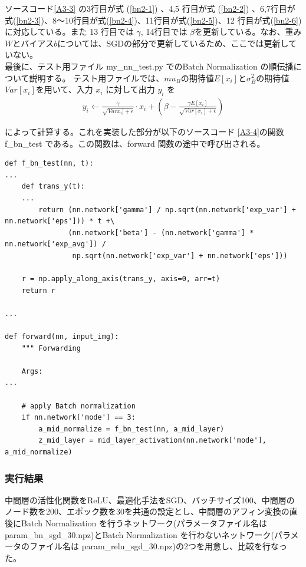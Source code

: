 \documentclass[a4paper,dvipdfmx]{jsarticle}
\begin{document}
ソースコード\ref{A3-3} の3行目が式 (\ref{bn2-1}) 、4,5 行目が式 (\ref{bn2-2}) 、6,7行目が式(\ref{bn2-3})、8〜10行目が式(\ref{bn2-4})、11行目が式(\ref{bn2-5})、12 行目が式(\ref{bn2-6}) に対応している。また 13 行目では $\gamma$, 14行目では $\beta $を更新している。なお、重み$W$とバイアス$b$については、SGDの部分で更新しているため、ここでは更新していない。\\


最後に、テスト用ファイル my\_nn\_test.py でのBatch Normalization の順伝播について説明する。
テスト用ファイルでは、$mu_B$の期待値$E[x_i]$と$\sigma_B^2$の期待値$Var[x_i]$を用いて、入力 $x_i$ に対して出力 $y_i$ を
\begin{eqnarray}
	\label{bn3-1}
	y_i \leftarrow \frac{\gamma}{\sqrt{Var{x_i] + \epsilon}}} \cdot x_i + (\beta - \frac{\gamma E[x_i]}{\sqrt{Var[x_i] + \epsilon}})
\end{eqnarray}

によって計算する。これを実装した部分が以下のソースコード \ref{A3-4}の関数 f\_bn\_test である。この関数は、forward 関数の途中で呼び出される。
\begin{lstlisting}[caption="Batch Normalization (テスト用: 順伝播)",label=A3-4]
def f_bn_test(nn, t):
...
    def trans_y(t):
	...
        return (nn.network['gamma'] / np.sqrt(nn.network['exp_var'] + nn.network['eps'])) * t +\
               (nn.network['beta'] - (nn.network['gamma'] * nn.network['exp_avg']) /
                np.sqrt(nn.network['exp_var'] + nn.network['eps']))

    r = np.apply_along_axis(trans_y, axis=0, arr=t)
    return r
    
...

def forward(nn, input_img):
    """ Forwarding

    Args:
...

    # apply Batch normalization
    if nn.network['mode'] == 3:
        a_mid_normalize = f_bn_test(nn, a_mid_layer)
        z_mid_layer = mid_layer_activation(nn.network['mode'], a_mid_normalize)
\end{lstlisting}

 \subsubsection*{実行結果}
 
 中間層の活性化関数をReLU、最適化手法をSGD、バッチサイズ100、中間層のノード数を200、エポック数を30を共通の設定とし、中間層のアフィン変換の直後にBatch Normalization を行うネットワーク(パラメータファイル名は param\_bn\_sgd\_30.npz)とBatch Normalization を行わないネットワーク(パラメータのファイル名は param\_relu\_sgd\_30.npz)の2つを用意し、比較を行なった。\\
 
\end{document}
